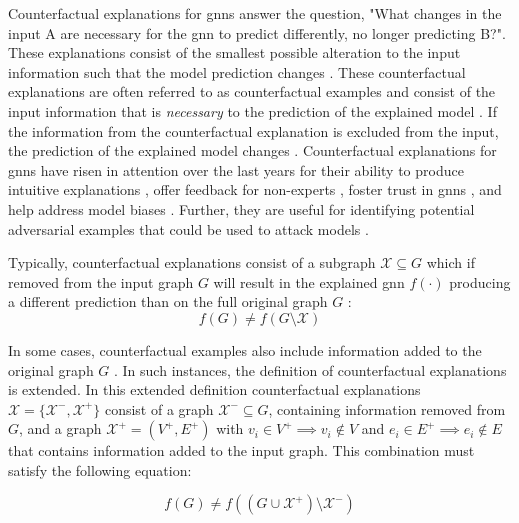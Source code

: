 Counterfactual explanations for \glspl{gnn} answer the question, "What changes in the input A are necessary for the \gls{gnn} to predict differently, no longer predicting B?". These explanations consist of the smallest possible alteration to the input information such that the model prediction changes \cite{kakkad_survey_2023}. These counterfactual explanations are often referred to as counterfactual examples and consist of the input information that is \textit{necessary} to the prediction of the explained model \cite{tan_learning_2022}. If the information from the counterfactual explanation is excluded from the input, the prediction of the explained model changes \cite{tan_learning_2022}. Counterfactual explanations for \glspl{gnn} have risen in attention over the last years \cite{ma_clear_2022} for their ability to produce intuitive explanations \cite{ma_clear_2022}, offer feedback for non-experts \cite{prado-romero_survey_2023}, foster trust in \glspl{gnn} \cite{prado-romero_survey_2023}, and help address model biases \cite{prado-romero_survey_2023}. Further, they are useful for identifying potential adversarial examples that could be used to attack models \cite{lucic_cf-gnnexplainer_2022}.

Typically, counterfactual explanations consist of a subgraph $\mathcal{X} \subseteq G$ which if removed from the input graph $G$ will result in the explained \gls{gnn} $f(\cdot)$ producing a different prediction than on the full original graph $G$ \cite{tan_learning_2022}:
\begin{equation}
    \label{e_cf_explanation}
    f(G) \neq f(G\setminus \mathcal{X})
\end{equation}

In some cases, counterfactual examples also include information added to the original graph $G$ \cite{abrate_counterfactual_2021}. In such instances, the definition of counterfactual explanations is extended. In this extended definition counterfactual explanations $\mathcal{X} = \{\mathcal{X}^-, \mathcal{X}^+\}$ consist of a graph $\mathcal{X}^- \subseteq G$, containing information removed from $G$, and a graph $\mathcal{X}^+ = (V^+, E^+)$ with ${v_i \in V^+ \implies v_i \notin V}$ and $e_i \in E^+ \implies e_i \notin E$ that contains information added to the input graph. This combination must satisfy the following equation:

\begin{equation}
    f(G) \neq f((G \cup \mathcal{X}^+) \setminus \mathcal{X^-})
\end{equation}

